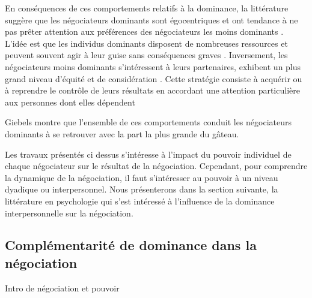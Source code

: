 	En conséquences de ces comportements relatifs à la dominance, la littérature suggère que les négociateurs dominants sont égocentriques et ont tendance à ne pas prêter attention aux préférences des négociateurs les moins dominants   \cite{fiske1993controlling, de1995impact}. L'idée est que les individus dominants disposent de nombreuses ressources et peuvent souvent agir à leur guise sans conséquences graves \cite{van2006power}. Inversement, les négociateurs moins dominants s'intéressent à leurs partenaires, exhibent un plus grand niveau d'équité et de considération \cite{de1995impact}. Cette stratégie consiste à acquérir ou à reprendre le contrôle de leurs résultats en accordant une attention particulière aux personnes dont elles dépendent \cite{fiske1993controlling}
	
	Giebels \cite{giebels2000interdependence} montre que l'ensemble de ces comportements conduit les négociateurs dominants à se retrouver avec la part la plus grande du gâteau.
	
	Les travaux présentés ci dessus s'intéresse à l'impact du pouvoir individuel de chaque négociateur sur le résultat de la négociation. Cependant, pour comprendre la dynamique de la négociation, il faut s'intéresser au pouvoir à un niveau dyadique ou interpersonnel. 
	Nous présenterons dans la section suivante, la littérature en psychologie qui s'est intéressé à l'influence de la dominance interpersonnelle sur la négociation. 

\subsection{Complémentarité de dominance dans la négociation}


Intro de négociation et pouvoir %


